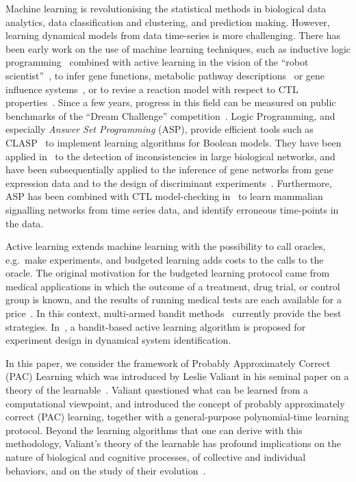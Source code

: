 \documentclass{llncs}
\begin{document}
Machine learning is revolutionising the statistical methods in biological data analytics,
data classification and clustering, and prediction making.
However, learning dynamical models from data time-series is more challenging.
There has been early work on the use of machine learning techniques, such as inductive
 logic programming~\cite{Muggleton95ngc} combined with active learning in the vision of the ``robot scientist''~\cite{BMOKRK01etai},
to infer gene functions,
metabolic pathway descriptions~\cite{AM02etai,AM02slps}
or gene influence systems~\cite{BCRG04jtb},
or to revise a reaction model with respect to CTL properties~\cite{CCFS06tcsb}.
Since a few years, progress in this field can be measured on public benchmarks
of the ``Dream Challenge'' competition~\cite{Meyer14bmc}.
Logic Programming, and especially \emph{Answer Set Programming} (ASP), provide efficient tools such as CLASP~\cite{GKNS07lpnmr}
to implement learning algorithms for Boolean models.
They have been applied in~\cite{GSTUV08iclp} to the detection of  inconsistencies in large biological networks,
and have been subsequentially applied to the inference of gene networks from gene expression data and to the design of discriminant experiments~\cite{VKASSSG15frontiers}.
Furthermore, ASP has been combined with CTL model-checking in~\cite{OPSSG16biosystems} to learn mammalian signalling networks from time series data,
and identify erroneous time-points in the data.

Active learning extends machine learning with the possibility to call oracles, e.g.~make experiments,
and budgeted learning adds costs to the calls to the oracle.
The original motivation for the budgeted learning protocol came from medical applications in which the outcome of a treatment,
drug trial, or control group is known, and the results of running medical tests are each available for a price~\cite{DZBSM13ml}.
In this context, multi-armed bandit methods~\cite{DBSSZ07icdm} currently provide the best strategies.
In~\cite{LMALS14ecml}, a bandit-based active learning algorithm is proposed for experiment design in dynamical system identification.

In this paper, we consider the framework of Probably Approximately Correct (PAC) Learning 
which was introduced by Leslie Valiant in his seminal paper on a theory of the learnable~\cite{Valiant84cacm}.
Valiant questioned what can be learned from a computational viewpoint,
and introduced the concept of probably approximately correct (PAC) learning,
together with a general-purpose polynomial-time learning protocol.
Beyond the learning algorithms that one can derive with this methodology,
Valiant's theory of the learnable has profound implications
on the nature of biological and cognitive processes,
of collective and individual behaviors,
and on the study of their evolution~\cite{Valiant13book}.
\end{document}
